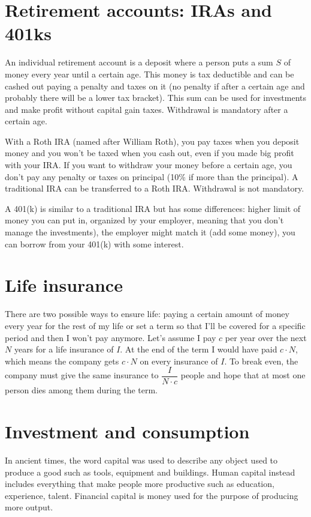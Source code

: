 \section{Retirement accounts: IRAs and 401ks}
An individual retirement account is a deposit where a person puts a sum $S$ of money every year until a certain age. This money is tax deductible and can be cashed out paying a penalty and taxes on it (no penalty if after a certain age and probably there will be a lower tax bracket). This sum can be used for investments and make profit without capital gain taxes. Withdrawal is mandatory after a certain age.

With a Roth IRA (named after William Roth), you pay taxes when you deposit money %
and you won't be taxed when you cash out, even if you made big profit with your IRA. If you want to withdraw your money before a certain age, you don't pay any penalty or taxes on principal (10\% if more than the principal). A traditional IRA can be transferred to a Roth IRA. Withdrawal is not mandatory.

A 401(k) is similar to a traditional IRA but has some differences: higher %
limit of money you can put in, organized by your employer, meaning that you don't manage the investments), the employer might match it (add some money), you can borrow from your 401(k) with some interest.

\section{Life insurance}
There are two possible ways to ensure life: paying a certain amount of money every year for the rest of my life or set a term so that I'll be covered for a specific period and then I won't pay anymore. Let's assume I pay $c$ per year over the next $N$ years for a life insurance of $I$. At the end of the term I would have paid $c\cdot N$, which means the company gets $c\cdot N$ on every insurance of $I$. To break even, the company must give the same insurance to $\dfrac{I}{N \cdot c}$ people and hope that at most one person dies among them during the term.

\section{Investment and consumption}
In ancient times, the word capital was used to describe any object used to produce a good such as tools, equipment and buildings. Human capital instead includes everything that make people more productive such as education, experience, talent. Financial capital is money used for the purpose of producing more output.

